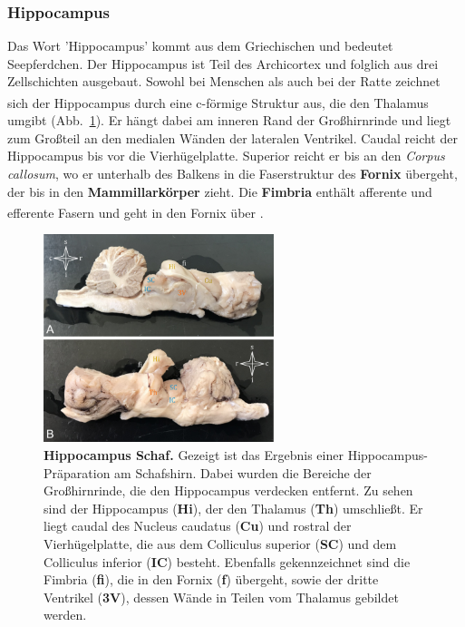 \documentclass[12pt,a4paper,pdftex]{article}
\begin{document}
\subsubsection*{Hippocampus}
\label{subsubsec:Hippocampus} 

Das Wort 'Hippocampus' kommt aus dem Griechischen und bedeutet Seepferdchen. Der Hippocampus ist Teil des Archicortex und folglich aus drei Zellschichten ausgebaut. Sowohl bei Menschen als auch bei der Ratte zeichnet sich der Hippocampus durch eine c-förmige Struktur aus, \textsuperscript{\cite[20]{paxinos2014rat}} die den Thalamus umgibt (Abb.~\ref{fig:hippocampus_schaf}). Er hängt dabei am inneren Rand der Großhirnrinde und liegt zum Großteil an den medialen Wänden der lateralen Ventrikel. Caudal reicht der Hippocampus bis vor die Vierhügelplatte. Superior reicht er bis an den \textit{Corpus callosum}, wo er unterhalb des Balkens in die Faserstruktur des \textbf{Fornix} übergeht, der bis in den \textbf{Mammillarkörper} zieht. Die \textbf{Fimbria} enthält afferente und efferente Fasern und geht in den Fornix über \textsuperscript{\cite[9]{trepel2011neuroanatomie}}.\\

\begin{figure}[H]
    \centering
    \includegraphics[width=0.6\textwidth]{pictures/Bilder_Jule/Schaf/Ausschnitte/hippocampus_schaf.png}
    \caption[Hippocampus Schaf]{\textbf{Hippocampus Schaf.} Gezeigt ist das Ergebnis einer Hippocampus-Präparation am Schafshirn. Dabei wurden die Bereiche der Großhirnrinde, die den Hippocampus verdecken entfernt. Zu sehen sind der Hippocampus (\textbf{Hi}), der den Thalamus (\textbf{Th}) umschließt. Er liegt caudal des Nucleus caudatus (\textbf{Cu}) und rostral der Vierhügelplatte, die aus dem Colliculus superior (\textbf{SC}) und dem Colliculus inferior (\textbf{IC}) besteht. Ebenfalls gekennzeichnet sind die Fimbria (\textbf{fi}), die in den Fornix (\textbf{f}) übergeht, sowie der dritte Ventrikel (\textbf{3V}), dessen Wände in Teilen vom Thalamus gebildet werden.}
    \label{fig:hippocampus_schaf}
\end{figure}{}
\end{document}

